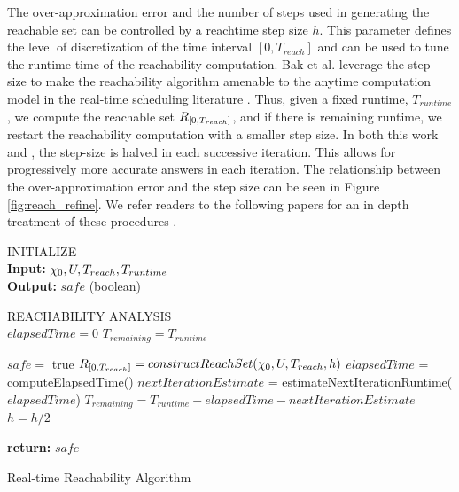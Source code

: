 \documentclass[manuscript,screen,review]{acmart}
\begin{document}
The over-approximation error and the number of steps used in generating the reachable set can be controlled by a reachtime step size $h$. This parameter defines the level of discretization  of the time interval $[0,T_{reach}]$ and can be used to tune the runtime time of the reachability computation. Bak et al. leverage the step size to make the reachability algorithm amenable to the anytime computation model in the real-time scheduling literature \cite{Liu1991}. Thus, given a fixed runtime, $T_{runtime}$, we compute the reachable set $\mathnormal{R}_{[0,T_{reach}]}$, and if there is remaining runtime, we restart the reachability computation with a smaller step size. In both this work and \cite{Bak2014}, the step-size is halved in each successive iteration. This allows for progressively more accurate answers in each iteration. The relationship between the over-approximation error and the step size can be seen in Figure \ref{fig:reach_refine}. We refer readers to the following papers for an in depth treatment of these procedures \cite{dang2000,Bak2014,Johnson2016}.









\begin{algorithm}[]%
\DontPrintSemicolon 
INITIALIZE{
\\
\textbf{Input:} $\chi_0,\mathnormal{U},T_{reach}, T_{runtime}$ \\
\textbf{Output:} $safe$ (boolean)
}

\vspace{2mm}

REACHABILITY ANALYSIS\\
$elapsedTime = 0$\;
$T_{remaining} = T_{runtime}$\;
 {
    $safe = $ true\;
    $\mathnormal{R}_{[0,T_{reach}]}= constructReachSet(\chi_0,\mathnormal{U},T_{reach},h)$\;
    $elapsedTime$ = computeElapsedTime()\;
    $nextIterationEstimate$ = estimateNextIterationRuntime($elapsedTime$)\;
    $T_{remaining} = T_{runtime} -elapsedTime - nextIterationEstimate$\;
    $h = h /2$\;
    
    
    
}
\textbf{return:} $safe$
\caption{Real-time Reachability Algorithm}
\label{alg:algo_rtreach}
\end{algorithm}%
\end{document}
